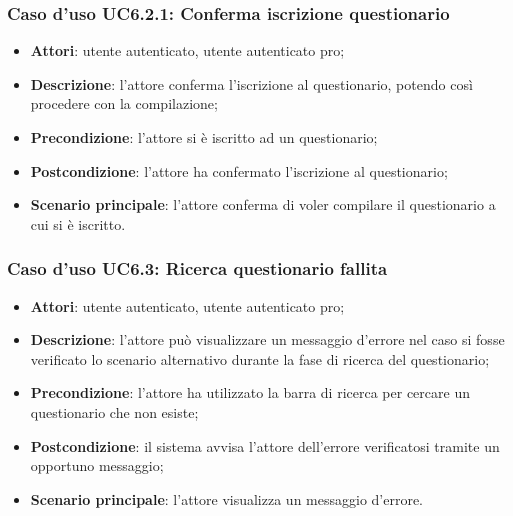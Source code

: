 \subsubsection{Caso d'uso UC6.2.1: Conferma iscrizione questionario}
\label{UC6.2.1}
\begin{itemize}
\item\textbf{Attori}: utente autenticato, utente autenticato pro;
\item\textbf{Descrizione}: l'attore conferma l'iscrizione al questionario, potendo così procedere con la compilazione;
\item\textbf{Precondizione}: l'attore si è iscritto ad un questionario;
\item\textbf{Postcondizione}: l'attore ha confermato l'iscrizione al questionario;
\item\textbf{Scenario principale}: l'attore conferma di voler compilare il questionario a cui si è iscritto.
\end{itemize}

\subsubsection{Caso d'uso UC6.3: Ricerca questionario fallita}
\label{UC6.3}
\begin{itemize}
\item\textbf{Attori}: utente autenticato, utente autenticato pro;
\item\textbf{Descrizione}: l'attore può visualizzare un messaggio d'errore nel caso si fosse verificato lo scenario alternativo durante la fase di ricerca del questionario;
\item\textbf{Precondizione}: l'attore ha utilizzato la barra di ricerca per cercare un questionario che non esiste;
\item\textbf{Postcondizione}: il sistema avvisa l'attore dell'errore verificatosi tramite un opportuno messaggio;
\item\textbf{Scenario principale}: l'attore visualizza un messaggio d'errore.
\end{itemize}